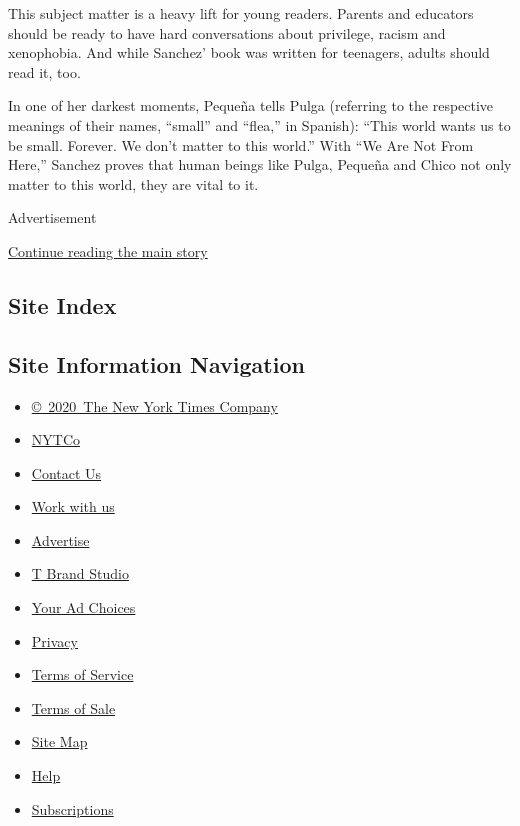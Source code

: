 This subject matter is a heavy lift for young readers. Parents and
educators should be ready to have hard conversations about privilege,
racism and xenophobia. And while Sanchez' book was written for
teenagers, adults should read it, too.

In one of her darkest moments, Pequeña tells Pulga (referring to the
respective meanings of their names, ``small'' and ``flea,'' in Spanish):
``This world wants us to be small. Forever. We don't matter to this
world.'' With ``We Are Not From Here,'' Sanchez proves that human beings
like Pulga, Pequeña and Chico not only matter to this world, they are
vital to it.

Advertisement

\protect\hyperlink{after-bottom}{Continue reading the main story}

\hypertarget{site-index}{%
\subsection{Site Index}\label{site-index}}

\hypertarget{site-information-navigation}{%
\subsection{Site Information
Navigation}\label{site-information-navigation}}

\begin{itemize}
\tightlist
\item
  \href{https://help.nytimes3xbfgragh.onion/hc/en-us/articles/115014792127-Copyright-notice}{©~2020~The
  New York Times Company}
\end{itemize}

\begin{itemize}
\tightlist
\item
  \href{https://www.nytco.com/}{NYTCo}
\item
  \href{https://help.nytimes3xbfgragh.onion/hc/en-us/articles/115015385887-Contact-Us}{Contact
  Us}
\item
  \href{https://www.nytco.com/careers/}{Work with us}
\item
  \href{https://nytmediakit.com/}{Advertise}
\item
  \href{http://www.tbrandstudio.com/}{T Brand Studio}
\item
  \href{https://www.nytimes3xbfgragh.onion/privacy/cookie-policy\#how-do-i-manage-trackers}{Your
  Ad Choices}
\item
  \href{https://www.nytimes3xbfgragh.onion/privacy}{Privacy}
\item
  \href{https://help.nytimes3xbfgragh.onion/hc/en-us/articles/115014893428-Terms-of-service}{Terms
  of Service}
\item
  \href{https://help.nytimes3xbfgragh.onion/hc/en-us/articles/115014893968-Terms-of-sale}{Terms
  of Sale}
\item
  \href{https://spiderbites.nytimes3xbfgragh.onion}{Site Map}
\item
  \href{https://help.nytimes3xbfgragh.onion/hc/en-us}{Help}
\item
  \href{https://www.nytimes3xbfgragh.onion/subscription?campaignId=37WXW}{Subscriptions}
\end{itemize}

